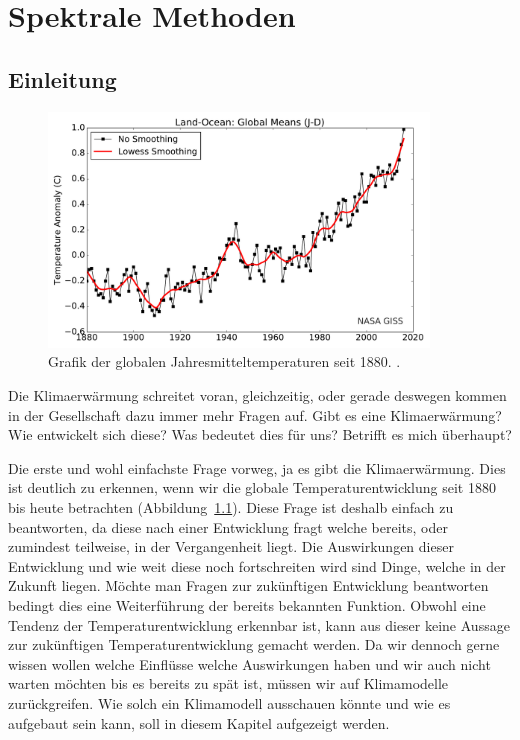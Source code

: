 \chapter{Spektrale Methoden\label{chapter:klima}}
\begin{refsection}

\section{Einleitung
\label{klima:section:einleitung}}

\begin{figure}
\centering
\includegraphics[width=0.9\textwidth]{klima/nasa_giss.pdf}
\caption{Grafik der globalen Jahresmitteltemperaturen seit 1880. \cite{klima:nasa}.
\label{klima:einleitung:nasa}}
\end{figure}

Die Klimaerwärmung schreitet voran, gleichzeitig, oder gerade deswegen kommen in der Gesellschaft dazu immer mehr Fragen auf. Gibt es eine Klimaerwärmung? Wie entwickelt sich diese? Was bedeutet dies für uns? Betrifft es mich überhaupt?

Die erste und wohl einfachste Frage vorweg, ja es gibt die Klimaerwärmung. Dies ist deutlich zu erkennen, wenn wir die globale Temperaturentwicklung seit 1880 bis heute betrachten (Abbildung~\ref{klima:einleitung:nasa}). Diese Frage ist deshalb einfach zu beantworten, da diese nach einer Entwicklung fragt welche bereits, oder zumindest teilweise, in der Vergangenheit liegt. Die Auswirkungen dieser Entwicklung und wie weit diese noch fortschreiten wird sind Dinge, welche in der Zukunft liegen. Möchte man Fragen zur zukünftigen Entwicklung beantworten bedingt dies eine Weiterführung der bereits bekannten Funktion. Obwohl eine Tendenz der Temperaturentwicklung erkennbar ist, kann aus dieser keine Aussage zur zukünftigen Temperaturentwicklung gemacht werden. Da wir dennoch gerne wissen wollen welche Einflüsse welche Auswirkungen haben und wir auch nicht warten möchten bis es bereits zu spät ist, müssen wir auf Klimamodelle zurückgreifen. Wie solch ein Klimamodell ausschauen könnte und wie es aufgebaut sein kann, soll in diesem Kapitel aufgezeigt werden.


\end{refsection}
